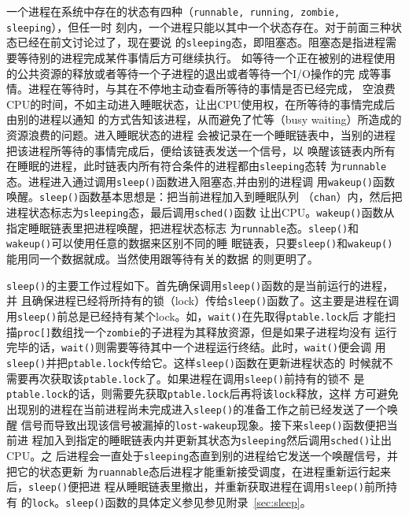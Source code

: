 \documentclass{swfuthesism}
\begin{document}
一个进程在系统中存在的状态有四种（\texttt{runnable, running, zombie, sleeping}），但任一时
刻内，一个进程只能以其中一个状态存在。对于前面三种状态已经在前文讨论过了，现在要说
的\texttt{sleeping}态，即阻塞态。阻塞态是指进程需要等待别的进程完成某件事情后方可继续执行。
如等待一个正在被别的进程使用的公共资源的释放或者等待一个子进程的退出或者等待一个I/O操作的完
成等事情\cite{stallings11os}。进程在等待时，与其在不停地主动查看所等待的事情是否已经完成，
空浪费CPU的时间，不如主动进入睡眠状态，让出CPU使用权，在所等待的事情完成后由别的进程以通知
的方式告知该进程，从而避免了忙等（busy waiting）所造成的资源浪费的问题。进入睡眠状态的进程
会被记录在一个睡眠链表中，当别的进程把该进程所等待的事情完成后，便给该链表发送一个信号，以
唤醒该链表内所有在睡眠的进程，此时链表内所有符合条件的进程都由\texttt{sleeping}态转
为\texttt{runnable}态。进程进入通过调用\texttt{sleep()}函数进入阻塞态,并由别的进程调
用\texttt{wakeup()}函数唤醒。\texttt{sleep()}函数基本思想是：把当前进程加入到睡眠队列
（\texttt{chan}）内，然后把进程状态标志为\texttt{sleeping}态，最后调用\texttt{sched()}函数
让出CPU。\texttt{wakeup()}函数从指定睡眠链表里把进程唤醒，把进程状态标志
为\texttt{runnable}态。\texttt{sleep()}和\texttt{wakeup()}可以使用任意的数据来区别不同的睡
眠链表，只要\texttt{sleep()}和\texttt{wakeup()}能用同一个数据就成。当然使用跟等待有关的数据
的则更明了。

\texttt{sleep()}的主要工作过程如下。首先确保调用\texttt{sleep()}函数的是当前运行的进程，并
且确保进程已经将所持有的锁（lock）传给\texttt{sleep()}函数了。这主要是进程在调
用\texttt{sleep()}前总是已经持有某个lock。如，\texttt{wait()}在先取得\texttt{ptable.lock}后
才能扫描\texttt{proc[]}数组找一个\texttt{zombie}的子进程为其释放资源，但是如果子进程均没有
运行完毕的话，\texttt{wait()}则需要等待其中一个进程运行终结。此时，\texttt{wait()}便会调
用\texttt{sleep()}并把\texttt{ptable.lock}传给它。这样\texttt{sleep()}函数在更新进程状态的
时候就不需要再次获取该\texttt{ptable.lock}了。如果进程在调用\texttt{sleep()}前持有的锁不
是\texttt{ptable.lock}的话，则需要先获取\texttt{ptable.lock}后再将该\texttt{lock}释放，这样
方可避免出现别的进程在当前进程尚未完成进入\texttt{sleep()}的准备工作之前已经发送了一个唤醒
信号而导致出现该信号被漏掉的\texttt{lost-wakeup}现象。接下来\texttt{sleep()}函数便把当前进
程加入到指定的睡眠链表内并更新其状态为\texttt{sleeping}然后调用\texttt{sched()}让出CPU。之
后进程会一直处于\texttt{sleeping}态直到别的进程给它发送一个唤醒信号，并把它的状态更新
为\texttt{ruannable}态后进程才能重新接受调度，在进程重新运行起来后，\texttt{sleep()}便把进
程从睡眠链表里撤出，并重新获取进程在调用\texttt{sleep()}前所持有
的\texttt{lock}。\texttt{sleep()}函数的具体定义参见参见附录~\ref{sec:sleep}。
\end{document}
